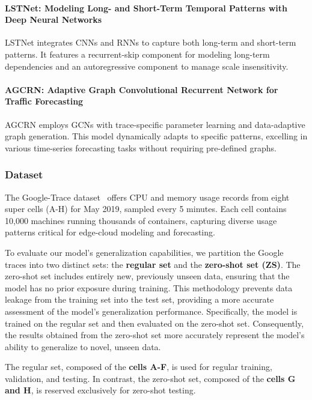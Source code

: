 \paragraph{LSTNet: Modeling Long- and Short-Term Temporal Patterns with Deep Neural Networks~\cite{lai2018modelinglongshorttermtemporal}}
\ac{LSTNet} integrates \acp{CNN} and \acp{RNN} to capture both long-term and short-term patterns. It features a recurrent-skip component for modeling long-term dependencies and an autoregressive component to manage scale insensitivity.

\paragraph{AGCRN: Adaptive Graph Convolutional Recurrent Network for Traffic Forecasting~\cite{AGCRN}}
\ac{AGCRN} employs GCNs with trace-specific parameter learning and data-adaptive graph generation. This model dynamically adapts to specific patterns, excelling in various time-series forecasting tasks without requiring pre-defined graphs.

\subsubsection{\textbf{Dataset}}
\label{subsubsec:ch4_dataset_details}

The Google-Trace dataset~\cite{google2019cluster} offers \ac{CPU} and memory usage records from eight super cells (A-H) for May 2019, sampled every 5 minutes. Each cell contains 10,000 machines running thousands of containers, capturing diverse usage patterns critical for edge-cloud modeling and forecasting.

To evaluate our model's generalization capabilities, we partition the Google traces into two distinct sets: the \textbf{regular set} and the \textbf{zero-shot set (ZS)}. The zero-shot set includes entirely new, previously unseen data, ensuring that the model has no prior exposure during training. This methodology prevents data leakage from the training set into the test set, providing a more accurate assessment of the model's generalization performance. Specifically, the model is trained on the regular set and then evaluated on the zero-shot set. Consequently, the results obtained from the zero-shot set more accurately represent the model's ability to generalize to novel, unseen data.

The regular set, composed of the \textbf{cells A-F}, is used for regular training, validation, and testing. In contrast, the zero-shot set, composed of the \textbf{cells G and H}, is reserved exclusively for zero-shot testing.

